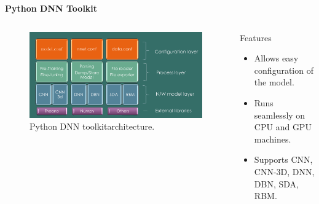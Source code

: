 \begin{frame}{\textbf{Python DNN Toolkit}}
\begin{columns}
	\begin{column}{0.55\textwidth}
		\begin{figure}
			\centering
				\includegraphics[width=\textwidth]{./img/architecture.png}
			\caption{Python DNN toolkit\footnotemark architecture.}
		\end{figure}
	\end{column}
	\begin{column}{0.4\textwidth}
		\begin{varblock}[\textwidth]{Features}
			\begin{itemize}							
				\item Allows easy configuration of the model.
				\item Runs seamlessly on CPU and GPU machines.
				\item Supports CNN, CNN-3D, DNN, DBN, SDA, RBM.			
			\end{itemize}
		\end{varblock}
	\end{column}
\end{columns}
\end{frame}
